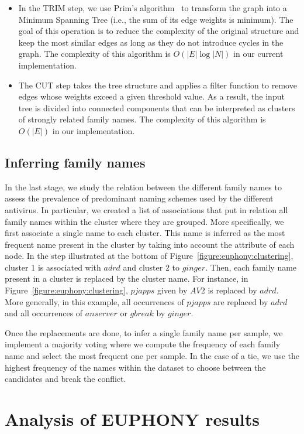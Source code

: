 \begin{itemize}
	\item In the TRIM step, we use Prim's algorithm~\cite{prim_shortest_1957} to transform the graph into a Minimum Spanning Tree (i.e., the sum of its edge weights is minimum). The goal of this operation is to reduce the complexity of the original structure and keep the most similar edges as long as they do not introduce cycles in the graph. The complexity of this algorithm is $O(|E|\log |N|)$ in our current implementation.
	\item The CUT step takes the tree structure and applies a filter function to remove edges whose weights exceed a given threshold value. As a result, the input tree is divided into connected components that can be interpreted as clusters of strongly related family names. The complexity of this algorithm is $O(|E|)$ in our implementation.
\end{itemize}

\subsection{Inferring family names}
In the last stage, we study the relation between the different family names to assess the prevalence of predominant naming schemes used by the different antivirus.
In particular, we created a list of associations that put in relation all family names within the cluster where they are grouped.
More specifically, we first associate a single name to each cluster.
This name is inferred as the most frequent name present in the cluster by taking into account the attribute of each node.
In the step illustrated at the bottom of Figure~\ref{figure:euphony:clustering}, cluster 1 is associated with $adrd$ and cluster 2 to $ginger$.
Then, each family name present in a cluster is replaced by the cluster name.
For instance, in Figure~\ref{figure:euphony:clustering}, $pjapps$ given by $AV2$ is replaced by $adrd$.
More generally, in this example, all occurrences of $pjapps$ are replaced by $adrd$ and all occurrences of $anserver$ or $gbreak$ by $ginger$.

Once the replacements are done, to infer a single family name per sample, we implement a majority voting where we compute the frequency of each family name and select the most frequent one per sample.
In the case of a tie, we use the highest frequency of the names within the dataset to choose between the candidates and break the conflict.
\section{Analysis of EUPHONY results}
